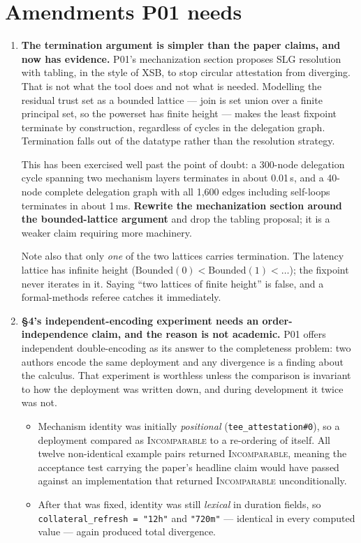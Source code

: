 \documentclass[11pt]{article}
\newcommand{\keypoint}[1]{\textbf{#1}}
\begin{document}
\vspace{0.6em}

\section*{Amendments P01 needs}

\begin{enumerate}

\item \keypoint{The termination argument is simpler than the paper claims, and
now has evidence.} P01's mechanization section proposes SLG resolution with
tabling, in the style of XSB, to stop circular attestation from diverging. That
is not what the tool does and not what is needed. Modelling the residual trust
set as a bounded lattice --- join is set union over a finite principal set, so
the powerset has finite height --- makes the least fixpoint terminate by
construction, regardless of cycles in the delegation graph. Termination falls
out of the datatype rather than the resolution strategy.

This has been exercised well past the point of doubt: a 300-node delegation
cycle spanning two mechanism layers terminates in about 0.01\,s, and a 40-node
complete delegation graph with all 1,600 edges including self-loops terminates
in about 1\,ms. \keypoint{Rewrite the mechanization section around the
bounded-lattice argument} and drop the tabling proposal; it is a weaker claim
requiring more machinery.

Note also that only \emph{one} of the two lattices carries termination. The
latency lattice has infinite height ($\mathrm{Bounded}(0) < \mathrm{Bounded}(1)
< \dots$); the fixpoint never iterates in it. Saying ``two lattices of finite
height'' is false, and a formal-methods referee catches it immediately.

\item \keypoint{\S4's independent-encoding experiment needs an
order-independence claim, and the reason is not academic.} P01 offers
independent double-encoding as its answer to the completeness problem: two
authors encode the same deployment and any divergence is a finding about the
calculus. That experiment is worthless unless the comparison is invariant to how
the deployment was written down, and during development it twice was not.

\begin{itemize}
  \item Mechanism identity was initially \emph{positional}
    (\texttt{tee\_attestation\#0}), so a deployment compared as
    \textsc{Incomparable} to a re-ordering of itself. All twelve non-identical
    example pairs returned \textsc{Incomparable}, meaning the acceptance test
    carrying the paper's headline claim would have passed against an
    implementation that returned \textsc{Incomparable} unconditionally.
  \item After that was fixed, identity was still \emph{lexical} in duration
    fields, so \texttt{collateral\_refresh = "12h"} and \texttt{"720m"} ---
    identical in every computed value --- again produced total divergence.
\end{itemize}


\end{enumerate}
\end{document}
